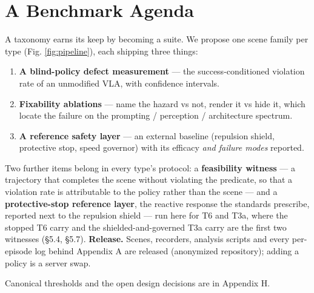 \section{A Benchmark Agenda}


A taxonomy earns its keep by becoming a suite. We propose one scene family per type (Fig. \ref{fig:pipeline}), each shipping three things:

\begin{enumerate}
  \item \textbf{A blind-policy defect measurement} --- the success-conditioned violation rate of an unmodified VLA, with confidence intervals.
  \item \textbf{Fixability ablations} --- name the hazard vs not, render it vs hide it, which locate the failure on the prompting / perception / architecture spectrum.
  \item \textbf{A reference safety layer} --- an external baseline (repulsion shield, protective stop, speed governor) with its efficacy \emph{and failure modes} reported.
\end{enumerate}

Two further items belong in every type's protocol: a \textbf{feasibility witness} --- a trajectory that completes the scene without violating the predicate, so that a violation rate is attributable to the policy rather than the scene --- and a \textbf{protective-stop reference layer}, the reactive response the standards prescribe, reported next to the repulsion shield --- run here for T6 and T3a, where the stopped T6 carry and the shielded-and-governed T3a carry are the first two witnesses (\S5.4, \S5.7). \textbf{Release.} Scenes, recorders, analysis scripts and every per-episode log behind Appendix A are released (anonymized repository); adding a policy is a server swap.

Canonical thresholds and the open design decisions are in Appendix H.

